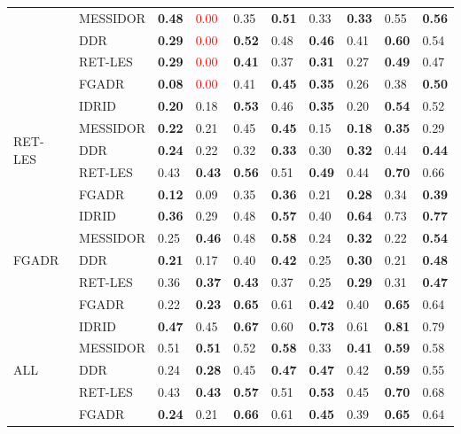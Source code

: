 \begin{table}[H]
\begin{tabularx}{\textwidth}{XX|ll|ll|ll|ll}
		& MESSIDOR & \textbf{0.48} & \textcolor{red}{0.00} & 0.35 & \textbf{0.51} & 0.33 & \textbf{0.33} & 0.55 & \textbf{0.56} \\
		& DDR & \textbf{0.29} & \textcolor{red}{0.00} & \textbf{0.52} & 0.48 & \textbf{0.46} & 0.41 & \textbf{0.60} & 0.54 \\
		& RET-LES & \textbf{0.29} & \textcolor{red}{0.00} & \textbf{0.41} & 0.37 & \textbf{0.31} & 0.27 & \textbf{0.49} & 0.47 \\
		& FGADR & \textbf{0.08} & \textcolor{red}{0.00} & 0.41 & \textbf{0.45} & \textbf{0.35} & 0.26 & 0.38 & \textbf{0.50} \\
		\midrule
		\multirow{5}{4em}{RET-LES} & IDRID & \textbf{0.20} & 0.18 & \textbf{0.53} & 0.46 & \textbf{0.35} & 0.20 & \textbf{0.54} & 0.52 \\
		& MESSIDOR & \textbf{0.22} & 0.21 & 0.45 & \textbf{0.45} & 0.15 & \textbf{0.18} & \textbf{0.35} & 0.29 \\
		& DDR & \textbf{0.24} & 0.22 & 0.32 & \textbf{0.33} & 0.30 & \textbf{0.32} & 0.44 & \textbf{0.44} \\
		& RET-LES & 0.43 & \textbf{0.43} & \textbf{0.56} & 0.51 & \textbf{0.49} & 0.44 & \textbf{0.70} & 0.66 \\
		& FGADR & \textbf{0.12} & 0.09 & 0.35 & \textbf{0.36} & 0.21 & \textbf{0.28} & 0.34 & \textbf{0.39} \\
		\midrule
		\multirow{5}{4em}{FGADR} & IDRID & \textbf{0.36} & 0.29 & 0.48 & \textbf{0.57} & 0.40 & \textbf{0.64} & 0.73 & \textbf{0.77} \\
		& MESSIDOR & 0.25 & \textbf{0.46} & 0.48 & \textbf{0.58} & 0.24 & \textbf{0.32} & 0.22 & \textbf{0.54} \\
		& DDR & \textbf{0.21} & 0.17 & 0.40 & \textbf{0.42} & 0.25 & \textbf{0.30} & 0.21 & \textbf{0.48} \\
		& RET-LES & 0.36 & \textbf{0.37} & \textbf{0.43} & 0.37 & 0.25 & \textbf{0.29} & 0.31 & \textbf{0.47} \\
		& FGADR & 0.22 & \textbf{0.23} & \textbf{0.65} & 0.61 & \textbf{0.42} & 0.40 & \textbf{0.65} & 0.64 \\
		\midrule
		\multirow{5}{4em}{ALL} & IDRID & \textbf{0.47} & 0.45 & \textbf{0.67} & 0.60 & \textbf{0.73} & 0.61 & \textbf{0.81} & 0.79 \\
		& MESSIDOR & 0.51 & \textbf{0.51} & 0.52 & \textbf{0.58} & 0.33 & \textbf{0.41} & \textbf{0.59} & 0.58 \\
		& DDR & 0.24 & \textbf{0.28} & 0.45 & \textbf{0.47} & \textbf{0.47} & 0.42 & \textbf{0.59} & 0.55 \\
		& RET-LES & 0.43 & \textbf{0.43} & \textbf{0.57} & 0.51 & \textbf{0.53} & 0.45 & \textbf{0.70} & 0.68 \\
		& FGADR & \textbf{0.24} & 0.21 & \textbf{0.66} & 0.61 & \textbf{0.45} & 0.39 & \textbf{0.65} & 0.64 \\
		\bottomrule
	\end{tabularx}
\end{table}

